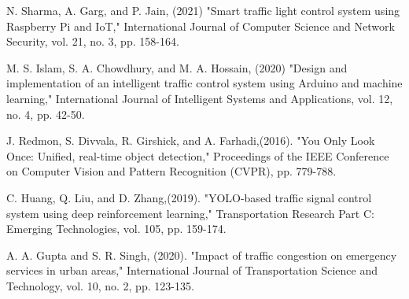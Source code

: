 \documentclass[conference]{IEEEtran}
\begin{document}
\begin{thebibliography}{00}
N. Sharma, A. Garg, and P. Jain, (2021) "Smart traffic light control system using Raspberry Pi and IoT," International Journal of Computer Science and Network Security, vol. 21, no. 3, pp. 158-164.

M. S. Islam, S. A. Chowdhury, and M. A. Hossain, (2020) "Design and implementation of an intelligent traffic control system using Arduino and machine learning," International Journal of Intelligent Systems and Applications, vol. 12, no. 4, pp. 42-50.

J. Redmon, S. Divvala, R. Girshick, and A. Farhadi,(2016). "You Only Look Once: Unified, real-time object detection," Proceedings of the IEEE Conference on Computer Vision and Pattern Recognition (CVPR), pp. 779-788.

C. Huang, Q. Liu, and D. Zhang,(2019). "YOLO-based traffic signal control system using deep reinforcement learning," Transportation Research Part C: Emerging Technologies, vol. 105, pp. 159-174.

A. A. Gupta and S. R. Singh, (2020). "Impact of traffic congestion on emergency services in urban areas," International Journal of Transportation Science and Technology, vol. 10, no. 2, pp. 123-135.
\end{thebibliography}
\end{document}
